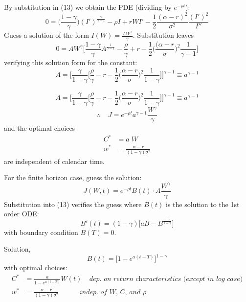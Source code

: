 \documentclass[
14pt,notheorems,hyperref={pdfauthor=whatever}
]{beamer}
\begin{document}
\begin{frame}
By substitution in (13) we obtain the PDE (dividing by $e^{-\rho t}$):
\[ 0 = \bigg(\frac{1-\gamma}{\gamma}\bigg)(I')^{\frac{\gamma}{\gamma-1}} - \rho I + rW I' - \frac{1}{2}\frac{(\alpha-r)^2}{\sigma^2}\frac{(I')^2}{I''}\]
Guess a solution of the form $I(W) = \frac{AW^\gamma}{\gamma}$. Substitution leaves\\
\[ 0 = AW^\gamma \bigg[ \frac{1-\gamma}{\gamma}A^{\frac{1}{\gamma-1}} - \frac{\rho}{\gamma}+r-\frac{1}{2}\bigg(\frac{(\alpha-r}{\sigma}\bigg)^2\frac{1}{\gamma-1}\bigg]\]
verifying this solution form for the constant:\\
\[ A = \Bigg[ \frac{\gamma}{1-\gamma} \bigg[ \frac{\rho}{\gamma} -r - \frac{1}{2}\bigg(\frac{\alpha-r}{\sigma}\bigg)^2\frac{1}{1-\gamma}\bigg]\Bigg]^{\gamma-1} \equiv a^{\gamma-1} \]
\end{frame}

\begin{frame}
\[ A = \Bigg[ \frac{\gamma}{1-\gamma} \bigg[ \frac{\rho}{\gamma} -r - \frac{1}{2}\bigg(\frac{\alpha-r}{\sigma}\bigg)^2\frac{1}{1-\gamma}\bigg]\Bigg]^{\gamma-1} \equiv a^{\gamma-1} \]
\[ \therefore \;\;\;\; J = e^{-\rho t} a^{\gamma-1} \frac{W^\gamma}{\gamma}\]
and the optimal choices
\begin{align*}
    C^* &= a\;W\\
    w^* &= \frac{\alpha-r}{(1-\gamma)\sigma^2}
\end{align*}
are independent of calendar time.
\end{frame}

\begin{frame}
For the finite horizon case, guess the solution:\\
\[ J(W,t) = e^{-\rho t} B(t) \cdot A \frac{W^\gamma}{\gamma}\]
Substitution into (13) verifies the guess where $B(t)$ is the solution to the 1st order ODE:\\
\[ B'(t) = (1-\gamma) \bigg[ aB-B^{\frac{-\gamma}{1-\gamma}}\bigg]\]
with boundary condition $B(T)=0$.\\
\end{frame}

\begin{frame}
Solution,\\
\[ B(t) = \bigg[ 1-e^{a(t-T)}\bigg]^{1-\gamma}\]
with optimal choices:\\
\begin{align*}
    C^* &= \frac{a}{1-e^{a(t-T)}}W(t)\;\;\;\; \textit{dep. on return characteristics (except in log case)}\\
    w^* &= \frac{\alpha-r}{(1-\gamma)\sigma^2}\;\;\;\;\;\;\;\;\;\;\;\textit{indep. of W, C, and $\rho$}
\end{align*}
\end{frame}
\end{document}
